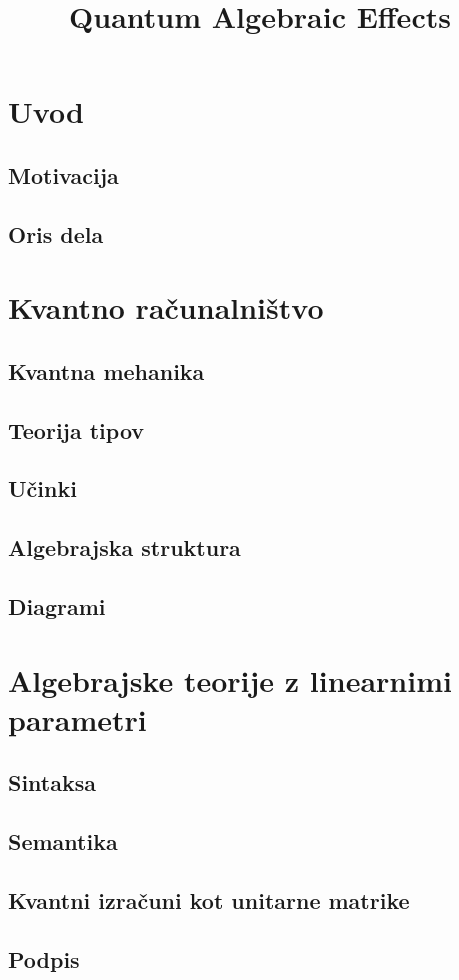 \documentclass[mat1]{fmfdelo}
\title{Quantum Algebraic Effects}
\begin{document}
\section{Uvod}
\subsection{Motivacija}
\subsection{Oris dela}  %

\section{Kvantno računalništvo}
\subsection{Kvantna mehanika}
\subsection{Teorija tipov}  %
\subsection{Učinki}  %
\subsection{Algebrajska struktura}
\subsection{Diagrami}

\section{Algebrajske teorije z linearnimi parametri}
\subsection{Sintaksa}
\subsection{Semantika}  %
\subsection{Kvantni izračuni kot unitarne matrike}  %
\subsection{Podpis}  %
\end{document}
